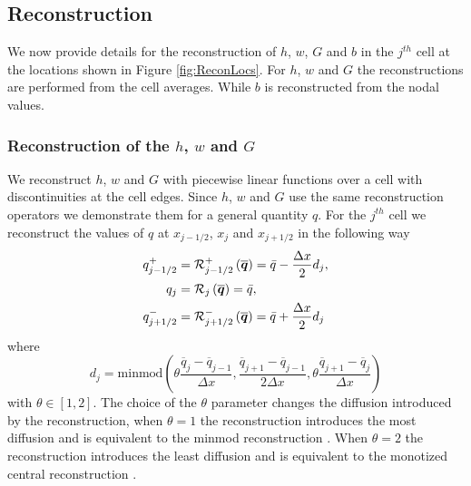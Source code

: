 \subsection{Reconstruction}
\label{subsec:Reconstruction}
We now provide details for the reconstruction of $h$, $w$, $G$ and $b$ in the $j^{th}$ cell at the locations shown in Figure \ref{fig:ReconLocs}. For $h$, $w$ and $G$ the reconstructions are performed from the cell averages. While $b$ is reconstructed from the nodal values.


\subsubsection{Reconstruction of the $h$, $w$ and $G$}
We reconstruct $h$, $w$ and $G$ with piecewise linear functions over a cell with discontinuities at the cell edges. Since $h$, $w$ and $G$ use the same reconstruction operators we demonstrate them for a general quantity $q$. For the $j^{th}$ cell we reconstruct the values of $q$ at $x_{j-1/2} $, $x_{j} $ and $x_{j+1/2}$ in the following way
\begin{subequations}
	\begin{align}
	q^+_{j-1/2} & = \mathcal{R}^+_{j-1/2} \left(\overline{\boldsymbol{q}}\right) = \bar{q} - \dfrac{\Delta x}{2} d_j, \\
	q_{j} &= \mathcal{R}_{j} \left(\overline{\boldsymbol{q}}\right) =\bar{q} ,\\
	q^-_{j+1/2} &= \mathcal{R}^-_{j+1/2} \left(\overline{\boldsymbol{q}}\right) = \bar{q} + \dfrac{\Delta x}{2} d_j
	\end{align}
	\label{eqn:ReconforhwG}
\end{subequations}
where 
\begin{equation}
d_j = \text{minmod}\left(\theta \dfrac{\overline{q}_j -\overline{q}_{j-1} }{\Delta x}, \dfrac{\overline{q}_{j+1} -\overline{q}_{j-1} }{2\Delta x}, \theta\dfrac{\overline{q}_{j+1} -\overline{q}_{j} }{\Delta x}\right)
\label{eqn:slopehGrecon}
\end{equation}
with $\theta \in \left[1,2\right]$. The choice of the $\theta$ parameter changes the diffusion introduced by the reconstruction, when $\theta =1$ the reconstruction introduces the most diffusion and is equivalent to the minmod reconstruction \cite{Roe-1986-337}. When $\theta = 2$ the reconstruction introduces the least diffusion and is equivalent to the monotized central reconstruction \cite{VanLeer-1977-276}.

